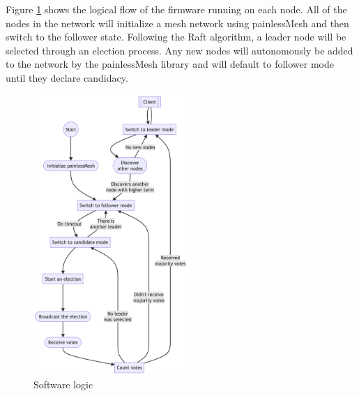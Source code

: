 Figure \ref{fig:flow} shows the logical flow of the firmware running on each node. All of the nodes in the network will initialize a mesh network using painlessMesh and then switch to the follower state. Following the Raft algorithm, a leader node will be selected through an election process. Any new nodes will autonomously be added to the network by the painlessMesh library and will default to follower mode until they declare candidacy.

\begin{figure}[H]
    \centering
    \includegraphics[width=0.53\textwidth]{final-proposal/images/final_design.png}
    \caption{Software logic}
    \label{fig:flow}






\end{figure}

